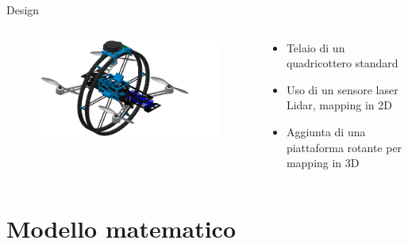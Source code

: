 \documentclass[]{beamer}
\begin{document}
	\begin{frame}{Design}
		\centering
		\begin{columns}
			\begin{column}{.5\textwidth}
				\centering
				\begin{figure}
					\includegraphics[scale=0.35]{images/render1.png}
				\end{figure}
			\end{column}
			\begin{column}{.5\textwidth}
				\centering
				\begin{itemize}
					\item Telaio di un quadricottero standard 
					\item Uso di un sensore laser Lidar, mapping in 2D
					\item Aggiunta di una piattaforma rotante per mapping in 3D
				\end{itemize}
			\end{column}
		\end{columns}
	\end{frame}
	
	
	\section{Modello matematico}
	
\end{document}
